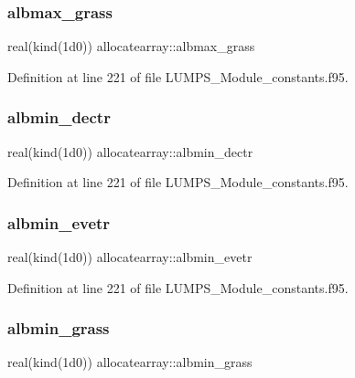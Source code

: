 \subsubsection{\texorpdfstring{albmax\+\_\+grass}{albmax\_grass}}
{\footnotesize\ttfamily real(kind(1d0)) allocatearray\+::albmax\+\_\+grass}



Definition at line 221 of file L\+U\+M\+P\+S\+\_\+\+Module\+\_\+constants.\+f95.

\mbox{\label{namespaceallocatearray_ab492b6627f6d8d971ea232940929793e}} 
\subsubsection{\texorpdfstring{albmin\+\_\+dectr}{albmin\_dectr}}
{\footnotesize\ttfamily real(kind(1d0)) allocatearray\+::albmin\+\_\+dectr}



Definition at line 221 of file L\+U\+M\+P\+S\+\_\+\+Module\+\_\+constants.\+f95.

\mbox{\label{namespaceallocatearray_afcc1bdcc6f5b7852565fb1489a7c4580}} 
\subsubsection{\texorpdfstring{albmin\+\_\+evetr}{albmin\_evetr}}
{\footnotesize\ttfamily real(kind(1d0)) allocatearray\+::albmin\+\_\+evetr}



Definition at line 221 of file L\+U\+M\+P\+S\+\_\+\+Module\+\_\+constants.\+f95.

\mbox{\label{namespaceallocatearray_a1dd0b37af5b6a2ba51c098d07cb6a3bc}} 
\subsubsection{\texorpdfstring{albmin\+\_\+grass}{albmin\_grass}}
{\footnotesize\ttfamily real(kind(1d0)) allocatearray\+::albmin\+\_\+grass}



